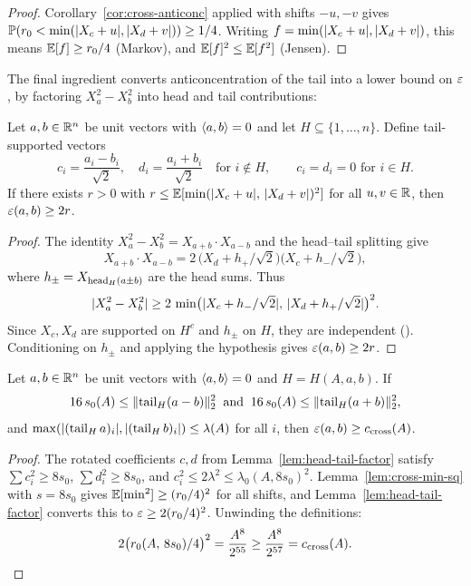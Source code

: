 \begin{proof}
Corollary~\ref{cor:cross-anticonc} applied with shifts $-u, -v$ gives
$\mathbb{P}(r_0 < \min(\lvert X_c+u \rvert, \lvert X_d+v \rvert)) \ge 1/4$.
Writing $f = \min(\lvert X_c+u \rvert, \lvert X_d+v \rvert)$, this means
$\mathbb{E}[f] \ge r_0/4$ (Markov), and $\mathbb{E}[f]^2 \le \mathbb{E}[f^2]$ (Jensen).
\end{proof}

The final ingredient converts anticoncentration of the tail into a
lower bound on $\varepsilon$, by factoring $X_a^2 - X_b^2$ into head and tail
contributions:

\begin{lemma}\label{lem:head-tail-factor}
Let $a, b \in \mathbb{R}^n$ be unit vectors with $\langle a,b\rangle = 0$ and let
$H \subseteq \{1, \dots, n\}$. Define tail-supported vectors
\[
c_i = \frac{a_i - b_i}{\sqrt{2}},\quad
d_i = \frac{a_i + b_i}{\sqrt{2}}
\quad \text{for } i \notin H,
\qquad
c_i = d_i = 0 \text{ for } i \in H.
\]
If there exists $r > 0$ with
$r \le \mathbb{E}[\min(\lvert X_c+u \rvert,\, \lvert X_d+v \rvert)^2]$
for all $u, v \in \mathbb{R}$, then $\varepsilon(a,b) \ge 2r$.
\end{lemma}

\begin{proof}
The identity $X_a^2 - X_b^2 = X_{a+b} \cdot X_{a-b}$ and the
head--tail splitting give
\[
X_{a+b} \cdot X_{a-b}
= 2\,\bigl(X_d + h_+/\sqrt{2}\bigr)
    \bigl(X_c + h_-/\sqrt{2}\bigr),
\]
where $h_\pm = X_{\operatorname{head}_H(a \pm b)}$ are the head sums. Thus
\[
\lvert X_a^2 - X_b^2 \rvert
\ge 2\,\min\bigl(\lvert X_c + h_-/\sqrt{2} \rvert,\,
\lvert X_d + h_+/\sqrt{2} \rvert\bigr)^2.
\]
Since $X_c, X_d$ are supported on $H^c$ and $h_\pm$ on $H$, they
are independent
().
Conditioning on $h_\pm$ and applying the hypothesis
gives $\varepsilon(a,b) \ge 2r$.
\end{proof}

\begin{proposition}\label{prop:diffuse-cross}
Let $a, b \in \mathbb{R}^n$ be unit vectors with $\langle a,b\rangle = 0$ and
$H = H(A,a,b)$. If
\[
16\,s_0(A) \le \lVert \operatorname{tail}_H(a - b) \rVert_2^2
\;\;\text{and}\;\;
16\,s_0(A) \le \lVert \operatorname{tail}_H(a + b) \rVert_2^2,
\]
and $\max(\lvert (\operatorname{tail}_H a)_i \rvert, \lvert (\operatorname{tail}_H b)_i \rvert)
\le \lambda(A)$ for all $i$, then
$\varepsilon(a,b) \ge c_{\mathrm{cross}}(A)$.
\end{proposition}

\begin{proof}
The rotated coefficients $c, d$ from
Lemma~\ref{lem:head-tail-factor} satisfy
$\sum c_i^2 \ge 8s_0$, $\sum d_i^2 \ge 8s_0$, and
$c_i^2 \le 2\lambda^2 \le \lambda_0(A, 8s_0)^2$.
Lemma~\ref{lem:cross-min-sq} with $s = 8s_0$ gives
$\mathbb{E}[\min^2] \ge (r_0/4)^2$ for all shifts, and
Lemma~\ref{lem:head-tail-factor} converts this to
$\varepsilon \ge 2(r_0/4)^2$. Unwinding the definitions:
\[
2\bigl(r_0(A,\, 8s_0)/4\bigr)^2
= \frac{A^8}{2^{55}}
\ge \frac{A^8}{2^{57}}
= c_{\mathrm{cross}}(A). \qedhere
\]
\end{proof}

